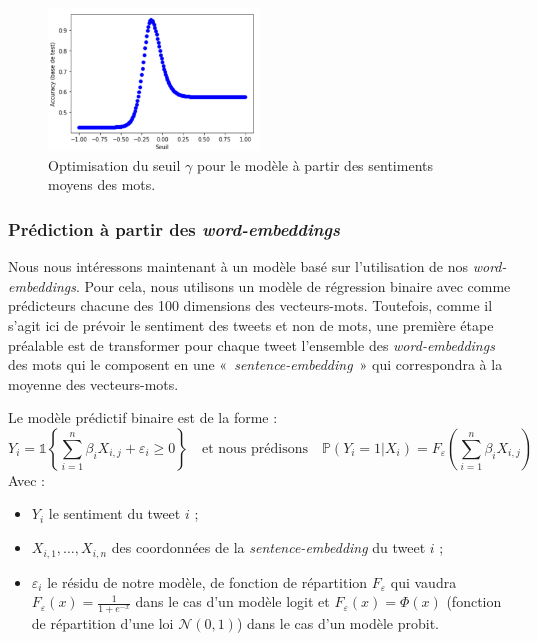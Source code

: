 \documentclass[11pt,french,french]{article}
\begin{document}
\begin{figure}[h]
\begin{center}
\includegraphics[width=0.5\textwidth]{img/max_baseline.png}
\captionsetup{margin=0cm,format=hang,justification=justified}
\caption{Optimisation du seuil $\gamma$ pour le modèle à partir des sentiments moyens des mots.}\label{fig:max_baseline}
\end{center}
\end{figure}

\hypertarget{sec:wordembeddings}{%
\subsubsection{\texorpdfstring{Prédiction à partir des \emph{word-embeddings}}{Prédiction à partir des word-embeddings}}\label{sec:wordembeddings}}

Nous nous intéressons maintenant à un modèle basé sur l'utilisation de nos \emph{word-embeddings}.
Pour cela, nous utilisons un modèle de régression binaire avec comme prédicteurs chacune des 100 dimensions des vecteurs-mots.
Toutefois, comme il s'agit ici de prévoir le sentiment des tweets et non de mots, une première étape préalable est de transformer pour chaque tweet l'ensemble des \emph{word-embeddings} des mots qui le composent en une «~\emph{sentence-embedding}~» qui correspondra à la moyenne des vecteurs-mots.

Le modèle prédictif binaire est de la forme :
\[
Y_i = \mathds{1}\left\{ \sum_{i = 1}^n \beta_i X_{i,j} + \varepsilon_i \geq 0 \right\} 
\quad 
\text{et nous prédisons} 
\quad  
\mathbb{P}(Y_i = 1 | X_{i}) = F_{\varepsilon}\left(\sum_{i = 1}^n \beta_i X_{i,j}\right)
\]
Avec :

\begin{itemize}
\item $Y_i$ le sentiment du tweet $i$ ;
\item $X_{i,1}, \dots, X_{i,n}$ des coordonnées de la \emph{sentence-embedding} du tweet $i$ ;
\item $\varepsilon_i$ le résidu de notre modèle, de fonction de répartition $F_{\varepsilon}$ qui vaudra $F_{\varepsilon}(x) = \frac{1}{1 + e^{-x}}$ dans le cas d'un modèle logit et $F_{\varepsilon}(x) = \Phi(x)$ (fonction de répartition d'une loi $\mathcal{N}(0, 1)$) dans le cas d'un modèle probit. 
\end{itemize}
\end{document}
